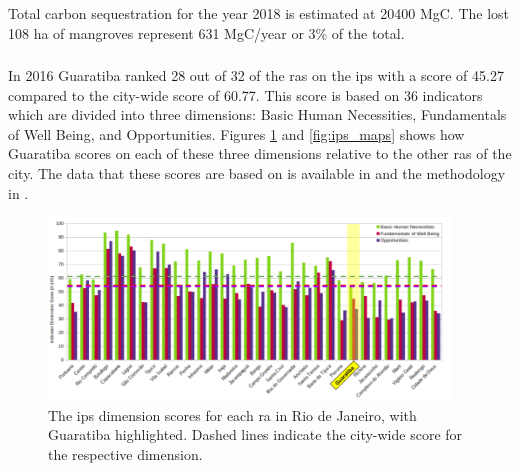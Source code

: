 Total carbon sequestration for the year 2018 is estimated at 20400 MgC. The lost 108 ha of mangroves represent 631 MgC/year or 3\% of the total. 

\subsubsection{} 

\paragraph{} \leavevmode\newline

In 2016 Guaratiba ranked 28 out of 32 of the \acp{ra} on the \ac{ips} with a score of 45.27 compared to the city-wide score of 60.77. This score is based on 36 indicators which are divided into three dimensions: Basic Human Necessities, Fundamentals of Well Being, and Opportunities. Figures \ref{fig:social_progress_indicator} and \ref{fig:ips_maps} shows how Guaratiba scores on each of these three dimensions relative to the other \acp{ra} of the city. The data that these scores are based on is available in \cite{institutopereirapassosBaseDadosIndice2022} and the methodology in \cite{puliciRelatorioMetodologicoIndice2016}.

\begin{figure}[!htb] 
\centering
\includegraphics[width=0.95\textwidth]{Figures/chap4/social_progress_indicator.png}
\caption[Graph of Social Progress Indicator for Rio de Janeiro]{The \acf{ips} dimension scores for each \ac{ra} in Rio de Janeiro, with Guaratiba highlighted. Dashed lines indicate the city-wide score for the respective dimension.}
\label{fig:social_progress_indicator}
\end{figure}


